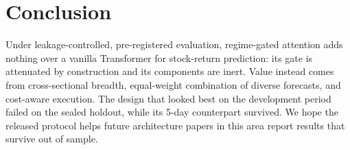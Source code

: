 \section{Conclusion}
Under leakage-controlled, pre-registered evaluation, regime-gated attention adds nothing over a vanilla Transformer for stock-return prediction: its gate is attenuated by construction and its components are inert. Value instead comes from cross-sectional breadth, equal-weight combination of diverse forecasts, and cost-aware execution. The design that looked best on the development period failed on the sealed holdout, while its 5-day counterpart survived. We hope the released protocol helps future architecture papers in this area report results that survive out of sample.
